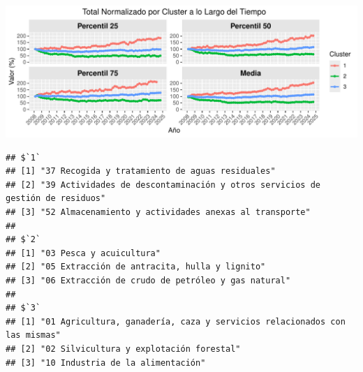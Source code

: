 \documentclass[notspecified,article,submit,moreauthors,pdftex]{Definitions/mdpi}
\newenvironment{Shaded}{\begin{snugshade}}{\end{snugshade}}
\newcommand{\AttributeTok}[1]{\textcolor[rgb]{0.13,0.29,0.53}{#1}}
\newcommand{\ControlFlowTok}[1]{\textcolor[rgb]{0.13,0.29,0.53}{\textbf{#1}}}
\newcommand{\DecValTok}[1]{\textcolor[rgb]{0.00,0.00,0.81}{#1}}
\newcommand{\FloatTok}[1]{\textcolor[rgb]{0.00,0.00,0.81}{#1}}
\newcommand{\FunctionTok}[1]{\textcolor[rgb]{0.13,0.29,0.53}{\textbf{#1}}}
\newcommand{\NormalTok}[1]{#1}
\newcommand{\OtherTok}[1]{\textcolor[rgb]{0.56,0.35,0.01}{#1}}
\newcommand{\SpecialCharTok}[1]{\textcolor[rgb]{0.81,0.36,0.00}{\textbf{#1}}}
\newcommand{\StringTok}[1]{\textcolor[rgb]{0.31,0.60,0.02}{#1}}
\begin{document}
\includegraphics{ProyectoAED2024_files/figure-latex/unnamed-chunk-47-1.pdf}

\begin{Shaded}
\end{Shaded}

\begin{verbatim}
## $`1`
## [1] "37 Recogida y tratamiento de aguas residuales"                              
## [2] "39 Actividades de descontaminación y otros servicios de gestión de residuos"
## [3] "52 Almacenamiento y actividades anexas al transporte"                       
## 
## $`2`
## [1] "03 Pesca y acuicultura"                          
## [2] "05 Extracción de antracita, hulla y lignito"     
## [3] "06 Extracción de crudo de petróleo y gas natural"
## 
## $`3`
## [1] "01 Agricultura, ganadería, caza y servicios relacionados con las mismas"
## [2] "02 Silvicultura y explotación forestal"                                 
## [3] "10 Industria de la alimentación"
\end{verbatim}
\end{document}
